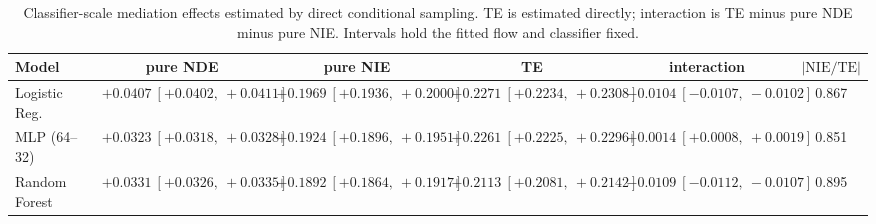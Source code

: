 \begin{table}[htbp]
  \centering
  \caption{Classifier-scale mediation effects estimated by direct conditional sampling. TE is estimated directly; interaction is TE minus pure NDE minus pure NIE. Intervals hold the fitted flow and classifier fixed.}
  \label{tab:german_synth_gap_overall}
  \begin{tabular}{lccccc}
    \toprule
    Model & pure NDE & pure NIE & TE & interaction & $|\mathrm{NIE}/\mathrm{TE}|$ \\
    \midrule
    Logistic Reg. & $+0.0407\ [+0.0402,\ +0.0411]$ & $+0.1969\ [+0.1936,\ +0.2000]$ & $+0.2271\ [+0.2234,\ +0.2308]$ & $-0.0104\ [-0.0107,\ -0.0102]$ & 0.867 \\
    MLP (64--32) & $+0.0323\ [+0.0318,\ +0.0328]$ & $+0.1924\ [+0.1896,\ +0.1951]$ & $+0.2261\ [+0.2225,\ +0.2296]$ & $+0.0014\ [+0.0008,\ +0.0019]$ & 0.851 \\
    Random Forest & $+0.0331\ [+0.0326,\ +0.0335]$ & $+0.1892\ [+0.1864,\ +0.1917]$ & $+0.2113\ [+0.2081,\ +0.2142]$ & $-0.0109\ [-0.0112,\ -0.0107]$ & 0.895 \\
    \bottomrule
  \end{tabular}
\end{table}
